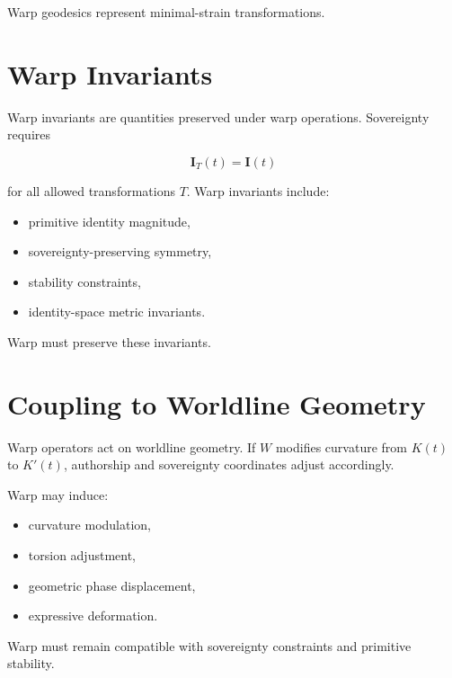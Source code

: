 \documentclass[12pt,twoside]{article}
\begin{document}
Warp geodesics represent minimal-strain transformations.

\section{Warp Invariants}

Warp invariants are quantities preserved under warp operations. Sovereignty requires



\[
\mathbf{I}_{T}(t) = \mathbf{I}(t)
\]



for all allowed transformations $T$. Warp invariants include:

\begin{itemize}
    \item primitive identity magnitude,
    \item sovereignty-preserving symmetry,
    \item stability constraints,
    \item identity-space metric invariants.
\end{itemize}

Warp must preserve these invariants.

\section{Coupling to Worldline Geometry}

Warp operators act on worldline geometry. If $W$ modifies curvature from $K(t)$ to
$K'(t)$, authorship and sovereignty coordinates adjust accordingly.

Warp may induce:

\begin{itemize}
    \item curvature modulation,
    \item torsion adjustment,
    \item geometric phase displacement,
    \item expressive deformation.
\end{itemize}

Warp must remain compatible with sovereignty constraints and primitive stability.

\end{document}
